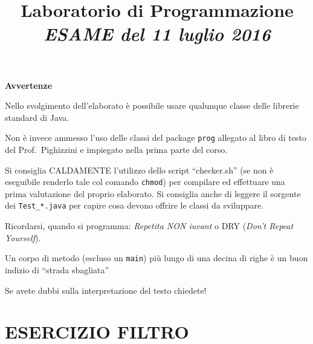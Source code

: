 \documentclass[12pt]{article}
\title{Laboratorio di Programmazione\\
\textit{ESAME del 11 luglio 2016}}
\date{}
\begin{document}
\maketitle


\hrulefill

\textbf{Avvertenze}

\begin{compactitem}
\item 
Nello svolgimento dell'elaborato è possibile
usare qualunque classe delle librerie standard di Java.

\item Non è invece
ammesso l'uso delle classi del package {\tt prog} allegato al libro di
testo del Prof.~Pighizzini e impiegato nella prima parte del corso.

\item Si consiglia CALDAMENTE l'utilizzo dello script ``checker.sh'' (se non è eseguibile renderlo tale col comando \texttt{chmod}) per 
compilare ed effettuare una prima valutazione del proprio elaborato.
Si consiglia anche di leggere il sorgente dei \texttt{Test\_*.java} per 
capire cosa devono offrire le classi da sviluppare.

\item Ricordarsi, quando si programma: \emph{Repetita NON iuvant} o DRY (\emph{Don't Repeat Yourself}).

\item Un corpo di metodo (escluso un \texttt{main}) più lungo di una decina di righe è un buon indizio di ``strada sbagliata''

\item Se avete dubbi sulla interpretazione del testo chiedete!

\end{compactitem}


\hrulefill

\section*{ESERCIZIO FILTRO}
\end{document}
